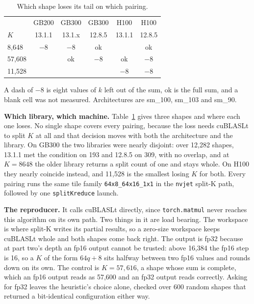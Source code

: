 \documentclass[sigplan,nonacm]{acmart}
\begin{document}
\begin{table}[t]
  \centering
  \caption{Which shape loses its tail on which pairing.}
  \label{tab:cublasbug}
  \footnotesize
  \setlength{\tabcolsep}{4pt}
  \begin{tabular}{lccccc}
    \toprule
        & GB200  & GB300  & GB300  & H100   & H100 \\
    $K$ & 13.1.1 & 13.1.x & 12.8.5 & 13.1.1 & 12.8.5 \\
    \midrule
     8,648 & $-8$ & $-8$ & ok   &      & ok   \\
    57,608 &      & ok   & $-8$ & ok   & $-8$ \\
    11,528 &      &      &      & $-8$ & $-8$ \\
    \bottomrule
  \end{tabular}

  \vspace{2pt}
  \parbox{\columnwidth}{\footnotesize A dash of $-8$ is eight values of $k$ left
  out of the sum, ok is the full sum, and a blank cell was not measured.
  Architectures are sm\_100, sm\_103 and sm\_90.}
\end{table}

\textbf{Which library, which machine.} Table~\ref{tab:cublasbug} gives three
shapes and where each one loses. No single shape covers every pairing, because
the loss needs cuBLASLt to split $K$ at all and that decision moves with both
the architecture and the library. On GB300 the two libraries were nearly
disjoint: over 12,282 shapes, 13.1.1 met the condition on 193 and 12.8.5 on 309,
with no overlap, and at $K = 8648$ the older library returns a split count of one
and stays whole. On H100 they nearly coincide instead, and 11,528 is the
smallest losing $K$ for both. Every pairing runs the same tile family
\texttt{64x8\_64x16\_1x1} in the \texttt{nvjet} split-K path, followed by one
\texttt{splitKreduce} launch.

\textbf{The reproducer.} It calls cuBLASLt directly, since
\texttt{torch.matmul} never reaches this algorithm on its own path. Two things
in it are load bearing. The workspace is where split-K writes its partial
results, so a zero-size workspace keeps cuBLASLt whole and both shapes come
back right. The output is fp32 because at part two's depth an fp16 output
cannot be trusted: above 16,384 the fp16 step is 16, so a $K$ of the form
$64q + 8$ sits
halfway between two fp16 values and rounds down on its own. The control is
$K = 57{,}616$, a shape whose sum is complete, which an fp16 output reads as
57,600 and an fp32 output reads correctly. Asking for fp32 leaves the heuristic's
choice alone, checked over 600 random shapes that returned a bit-identical
configuration either way.
\end{document}
